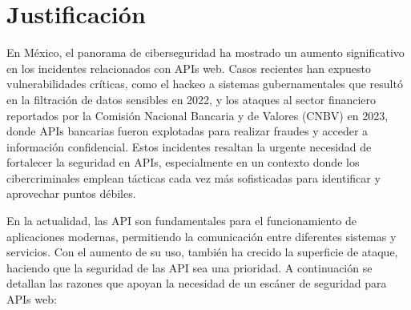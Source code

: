 \documentclass{article}
\begin{document}
    \section{Justificación}

    En México, el panorama de ciberseguridad ha mostrado un aumento significativo en los incidentes relacionados con APIs web. Casos recientes han expuesto vulnerabilidades críticas, como el hackeo a sistemas gubernamentales que resultó en la filtración de datos sensibles en 2022, y los ataques al sector financiero reportados por la Comisión Nacional Bancaria y de Valores (CNBV) en 2023, donde APIs bancarias fueron explotadas para realizar fraudes y acceder a información confidencial. Estos incidentes resaltan la urgente necesidad de fortalecer la seguridad en APIs, especialmente en un contexto donde los cibercriminales emplean tácticas cada vez más sofisticadas para identificar y aprovechar puntos débiles.

    En la actualidad, las API son fundamentales para el funcionamiento de aplicaciones modernas, permitiendo la comunicación entre diferentes sistemas y servicios. Con el aumento de su uso, también ha crecido la superficie de ataque, haciendo que la seguridad de las API sea una prioridad. A continuación se detallan las razones que apoyan la necesidad de un escáner de seguridad para APIs web:
\end{document}
